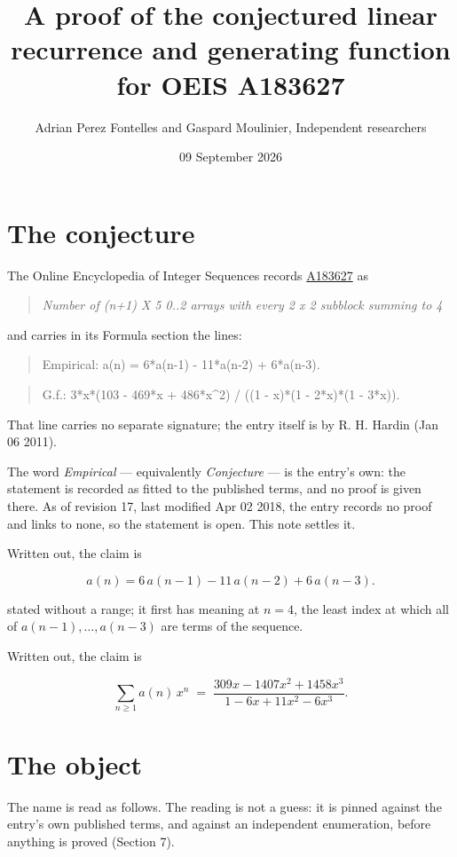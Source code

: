 \documentclass[11pt]{article}
\title{A proof of the conjectured linear recurrence and generating function for OEIS A183627}
\author{Adrian Perez Fontelles and Gaspard Moulinier, Independent researchers}
\date{09 September 2026}
\theoremstyle{definition}
\begin{document}
\maketitle
\section{The conjecture}

The Online Encyclopedia of Integer Sequences records \href{https://oeis.org/A183627}{A183627} as

\begin{quote}\itshape Number of (n+1) X 5 0..2 arrays with every 2 x 2 subblock summing to 4\end{quote}

and carries in its Formula section the lines:

\begin{quote}\ttfamily Empirical: a(n) = 6*a(n-1) - 11*a(n-2) + 6*a(n-3).\end{quote}

\begin{quote}\ttfamily G.f.: 3*x*(103 - 469*x + 486*x\textasciicircum{}2) / ((1 - x)*(1 - 2*x)*(1 - 3*x)).\end{quote}

That line carries no separate signature; the entry itself is by R. H. Hardin (Jan 06 2011).

The word {\itshape Empirical} --- equivalently {\itshape Conjecture} --- is the entry's own: the statement is recorded as fitted to the published terms, and no proof is given there. As of revision 17, last modified Apr 02 2018, the entry records no proof and links to none, so the statement is open. This note settles it.

Written out, the claim is

\[a(n) = 6\,a(n-1) - 11\,a(n-2) + 6\,a(n-3).\]

stated without a range; it first has meaning at $n = 4$, the least index at which all of $a(n-1),\dots,a(n-3)$ are terms of the sequence.

Written out, the claim is

\[\sum_{n \ge 1} a(n)\,x^n \;=\; \frac{309x - 1407x^{2} + 1458x^{3}}{1 - 6x + 11x^{2} - 6x^{3}}.\]

\section{The object}

The name is read as follows. The reading is not a guess: it is pinned against the entry's own published terms, and against an independent enumeration, before anything is proved (Section 7).
\end{document}
